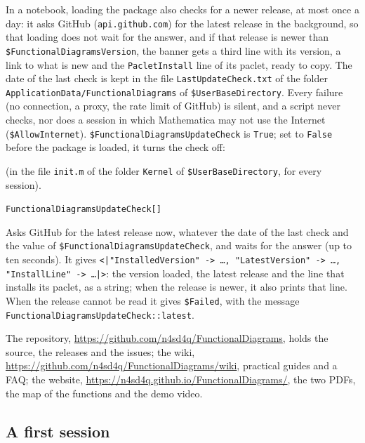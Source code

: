 \documentclass[11pt,a4paper]{article}
\makeatletter
\newcommand{\pkg}[1]{\texttt{#1}}
\newenvironment{function}[1]{\par\if@nobreak\else\medskip\needspace{4\baselineskip}\fi\noindent\phantomsection\label{fn:#1}%
  \begin{fnbox}}{\end{fnbox}\par\nobreak}
\newcommand{\syntax}[1]{\texttt{#1}\par}
\makeatother
\begin{document}
In a notebook, loading the package also checks for a newer release, at most once a day: it asks GitHub
(\pkg{api.github.com}) for the latest release in the background, so that loading does not wait for the answer, and if
that release is newer than \pkg{\$FunctionalDiagramsVersion}, the banner gets a third line with its version, a link to
what is new and the \pkg{PacletInstall} line of its paclet, ready to copy. The date of the last check is kept in the
file \pkg{LastUpdateCheck.txt} of the folder \pkg{ApplicationData/FunctionalDiagrams} of \pkg{\$UserBaseDirectory}.
Every failure (no connection, a proxy, the rate limit of GitHub) is silent, and a script never checks, nor does a
session in which Mathematica may not use the Internet (\pkg{\$AllowInternet}). \pkg{\$FunctionalDiagramsUpdateCheck}
is \pkg{True}; set to \pkg{False} before the package is loaded, it turns the check off:
(in the file \pkg{init.m} of the folder \pkg{Kernel} of \pkg{\$UserBaseDirectory}, for every session).

\begin{function}{FunctionalDiagramsUpdateCheck}
\syntax{FunctionalDiagramsUpdateCheck[]}
\end{function}
Asks GitHub for the latest release now, whatever the date of the last check and the value of
\pkg{\$FunctionalDiagramsUpdateCheck}, and waits for the answer (up to ten seconds). It gives
\pkg{<|"InstalledVersion" -> \dots, "LatestVersion" -> \dots, "InstallLine" -> \dots|>}: the version loaded, the
latest release and the line that installs its paclet, as a string; when the release is newer, it also prints that line.
When the release cannot be read it gives \pkg{\$Failed}, with the message \pkg{FunctionalDiagramsUpdateCheck::latest}.

The repository, \url{https://github.com/n4sd4q/FunctionalDiagrams}, holds the source, the releases and the issues;
the wiki, \url{https://github.com/n4sd4q/FunctionalDiagrams/wiki}, practical guides and a FAQ; the website,
\url{https://n4sd4q.github.io/FunctionalDiagrams/}, the two PDFs, the map of the functions and the demo video.

\subsection{A first session}
\end{document}
